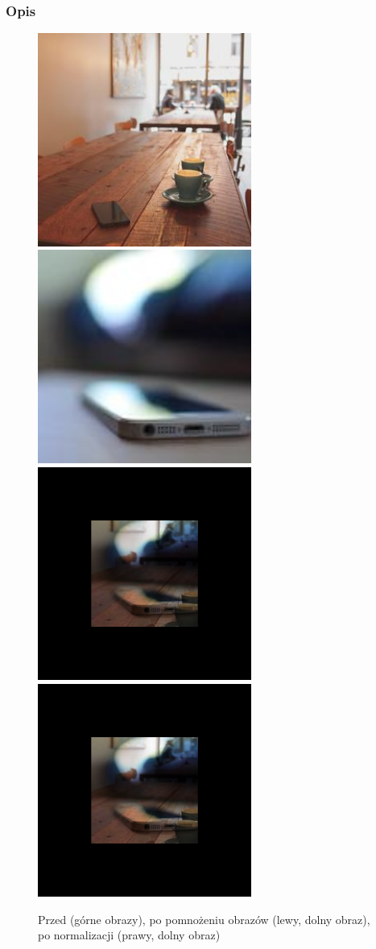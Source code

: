 \documentclass[a4paper,12pt]{book}
\begin{document}
\subsubsection*{Opis}
\begin{figure}[H]
	\caption{Przed (górne obrazy), po pomnożeniu obrazów (lewy, dolny obraz), po normalizacji (prawy, dolny obraz)}
	\includegraphics[width=7cm, height=7cm]{coffee-unmodified.jpg}
	\includegraphics[width=7cm, height=7cm]{phone-unmodified.jpg}
	\includegraphics[width=7cm, height=7cm]{3-2/multiply-color-images-coffee-phone.png}
	\includegraphics[width=7cm, height=7cm]{3-2/multiply-color-images-coffee-phone-norm.png}

\end{figure}
\end{document}
